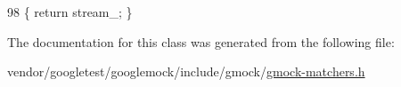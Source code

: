 \begin{DoxyCode}
98 \{ \textcolor{keywordflow}{return} stream\_; \}
\end{DoxyCode}


The documentation for this class was generated from the following file\+:\begin{DoxyCompactItemize}
\item 
vendor/googletest/googlemock/include/gmock/\hyperlink{gmock-matchers_8h}{gmock-\/matchers.\+h}\end{DoxyCompactItemize}
